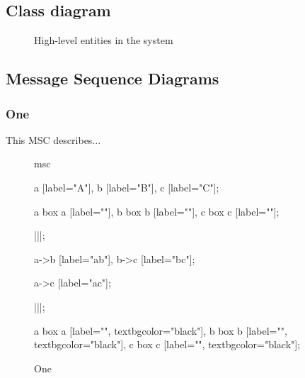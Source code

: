 \subsection{Class diagram}
	\begin{figure}
		\centering
		\caption{High-level entities in the system}
		\label{fig:analysis-model}
	\end{figure}

\subsection{Message Sequence Diagrams}
	\subsubsection{One}
		This MSC describes...
		\begin{figure}
			\centering
			\begin{msc}
				msc
				{

					a [label="A"],
					b [label="B"],
					c [label="C"];

					a box a [label=""],
					b box b [label=""],
					c box c [label=""];

					|||;
					
					a->b [label="ab"],
					b->c [label="bc"];
					
					a->c [label="ac"];

					|||;

					a box a [label="", textbgcolor="black"],
					b box b [label="", textbgcolor="black"],
					c box c [label="", textbgcolor="black"];

				}
			\end{msc}
			\caption{One}
			\label{msc:one}
		\end{figure}